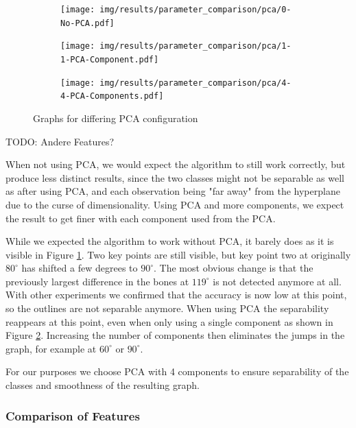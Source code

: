 \documentclass[pdftex,12pt,a4paper]{report}
\begin{document}
 \begin{figure}[h]
 	\centering
 	\begin{subfigure}[b]{0.32\textwidth}
 		\centering
 		\texttt{[image: img/results/parameter\_comparison/pca/0-No-PCA.pdf]}
 		\label{fig:pca-0}
 	\end{subfigure}
 	\begin{subfigure}[b]{0.32\textwidth}
 		\centering
 		\texttt{[image: img/results/parameter\_comparison/pca/1-1-PCA-Component.pdf]}
 		\label{fig:pca-1}
 	\end{subfigure}
 	\begin{subfigure}[b]{0.32\textwidth}
 		\centering
 		\texttt{[image: img/results/parameter\_comparison/pca/4-4-PCA-Components.pdf]}
 		\label{fig:pca-2}
 	\end{subfigure}
 	\caption{Graphs for differing PCA configuration}
 	\label{fig:pca}
 \end{figure}

TODO: Andere Features?

When not using PCA, we would expect the algorithm to still work correctly, but produce less distinct results, since the two classes might not be separable as well as after using PCA, and each observation being "far away" from the hyperplane due to the curse of dimensionality. Using PCA and more components, we expect the result to get finer with each component used from the PCA.
 
While we expected the algorithm to work without PCA, it barely does as it is visible in Figure \ref{fig:pca-0}. Two key points are still visible, but key point two at originally $80^\circ$ has shifted a few degrees to $90^\circ$. The most obvious change is that the previously largest difference in the bones at $119^\circ$ is not detected anymore at all. With other experiments we confirmed that the accuracy is now low at this point, so the outlines are not separable anymore. When using PCA the separability reappears at this point, even when only using a single component as shown in Figure \ref{fig:pca-1}. Increasing the number of components then eliminates the jumps in the graph, for example at $60^\circ$ or $90^\circ$.

For our purposes we choose PCA with 4 components to ensure separability of the classes and smoothness of the resulting graph.

\subsubsection{Comparison of Features}
\end{document}
